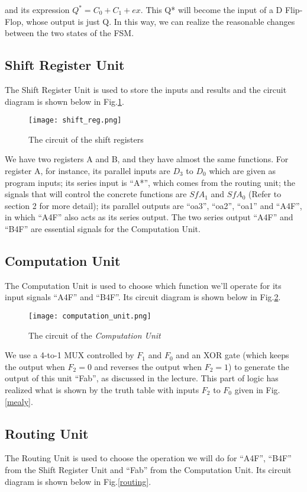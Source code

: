 \documentclass[12pt]{article}
\begin{document}
and its expression $Q^*=C_0+C_1+ex$. This Q* will become the input of a D Flip-Flop, whose output is just Q. In this way, we can realize the reasonable changes between the two states of the FSM.

\subsection{Shift Register Unit}
The Shift Register Unit is used to store the inputs and results and the circuit diagram is shown below in Fig.\ref{shift}. 
\begin{figure}[h]
    \centering
    \texttt{[image: shift\_reg.png]}
    \caption{The circuit of the shift registers}
    \label{shift}
\end{figure}
We have two registers A and B, and they have almost the same functions. For register A, for instance, its parallel inputs are $D_3$ to $D_0$ which are given as program inputs; its series input is “A*”, which comes from the routing unit; the signals that will control the concrete functions are $SfA_1$ and $SfA_0$ (Refer to section 2 for more detail); its parallel outputs are “oa3”, “oa2”, “oa1” and “A4F”, in which “A4F” also acts as its series output. The two series output “A4F” and “B4F” are essential signals for the Computation Unit.

\subsection{Computation Unit}
The Computation Unit is used to choose which function we’ll operate for its input signals “A4F” and “B4F”. Its circuit diagram is shown below in Fig.\ref{cu}.

\begin{figure}[h]
    \centering
    \texttt{[image: computation\_unit.png]}
    \caption{The circuit of the \textit{Computation Unit}}
    \label{cu}
\end{figure}

We use a 4-to-1 MUX controlled by $F_1$ and $F_0$ and an XOR gate (which keeps the output when $F_2=0$ and reverses the output when $F_2=1$) to generate the output of this unit “Fab”, as discussed in the lecture. This part of logic has realized what is shown by the truth table with inputs $F_2$ to $F_0$ given in Fig.\ref{mealy}.

\subsection{Routing Unit}
The Routing Unit is used to choose the operation we will do for “A4F”, “B4F” from the Shift Register Unit and “Fab” from the Computation Unit. Its circuit diagram is shown below in Fig.\ref{routing}. 
\end{document}
